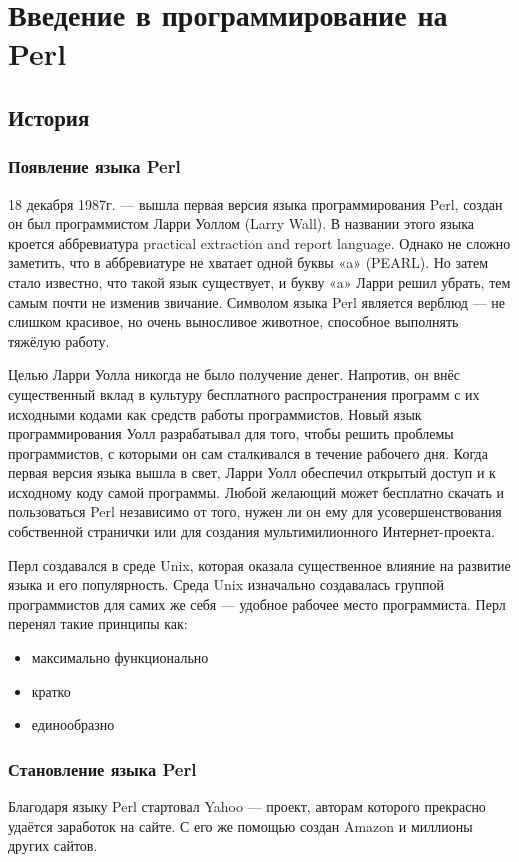 \chapter{Введение в программирование на Perl}
\section{История}
\subsection{Появление языка Perl}
18 декабря 1987г. — вышла первая версия языка программирования Perl, создан он был программистом Ларри Уоллом (Larry Wall). В названии этого языка кроется аббревиатура practical extraction and report language. Однако не сложно заметить, что в аббревиатуре не хватает одной буквы «a» (PEARL). Но затем стало известно, что такой язык существует, и букву «a» Ларри решил убрать, тем самым почти не изменив звичание. Символом языка Perl является верблюд — не слишком красивое, но очень выносливое животное, способное выполнять тяжёлую работу.

Целью Ларри Уолла никогда не было получение денег. Напротив, он внёс существенный вклад в культуру бесплатного распространения программ с их исходными кодами как средств работы программистов. Новый язык программирования Уолл разрабатывал для того, чтобы решить проблемы программистов, с которыми он сам сталкивался в течение рабочего дня. Когда первая версия языка вышла в свет, Ларри Уолл обеспечил открытый доступ и к исходному коду самой программы. Любой желающий может бесплатно скачать и пользоваться Perl независимо от того, нужен ли он ему для усовершенствования собственной странички или для создания мультимилионного Интернет-проекта. 

Перл создавался в среде Unix, которая оказала существенное влияние на развитие языка и его популярность. Среда Unix изначально создавалась группой программистов для самих же себя — удобное рабочее место программиста. Перл перенял такие принципы как:
\begin{itemize}
 \item максимально функционально
 \item кратко
 \item единообразно
\end{itemize}

\subsection{Становление языка Perl}
Благодаря языку Perl стартовал Yahoo — проект, авторам которого прекрасно удаётся заработок на сайте. С его же помощью создан Amazon и миллионы других сайтов.

